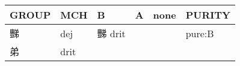 \documentclass[14pt,a4paper]{scrartcl}
\begin{document}
\begin{longtable}[c]{@{}llllll@{}}
\toprule
\begin{minipage}[b]{0.14\columnwidth}\raggedright\strut
GROUP
\strut\end{minipage} &
\begin{minipage}[b]{0.14\columnwidth}\raggedright\strut
MCH
\strut\end{minipage} &
\begin{minipage}[b]{0.14\columnwidth}\raggedright\strut
B
\strut\end{minipage} &
\begin{minipage}[b]{0.14\columnwidth}\raggedright\strut
A
\strut\end{minipage} &
\begin{minipage}[b]{0.14\columnwidth}\raggedright\strut
none
\strut\end{minipage} &
\begin{minipage}[b]{0.14\columnwidth}\raggedright\strut
PURITY
\strut\end{minipage}\tabularnewline
\midrule
\endhead
\begin{minipage}[t]{0.14\columnwidth}\raggedright\strut
豒
\strut\end{minipage} &
\begin{minipage}[t]{0.14\columnwidth}\raggedright\strut
dej
\strut\end{minipage} &
\begin{minipage}[t]{0.14\columnwidth}\raggedright\strut
豒 drit
\strut\end{minipage} &
\begin{minipage}[t]{0.14\columnwidth}\raggedright\strut
\strut\end{minipage} &
\begin{minipage}[t]{0.14\columnwidth}\raggedright\strut
\strut\end{minipage} &
\begin{minipage}[t]{0.14\columnwidth}\raggedright\strut
pure:B
\strut\end{minipage}\tabularnewline
\begin{minipage}[t]{0.14\columnwidth}\raggedright\strut
弟
\strut\end{minipage} &
\begin{minipage}[t]{0.14\columnwidth}\raggedright\strut
drit
\strut\end{minipage} &
\begin{minipage}[t]{0.14\columnwidth}\raggedright\strut
\strut\end{minipage} &
\begin{minipage}[t]{0.14\columnwidth}\raggedright\strut

\end{minipage}
\end{longtable}
\end{document}
